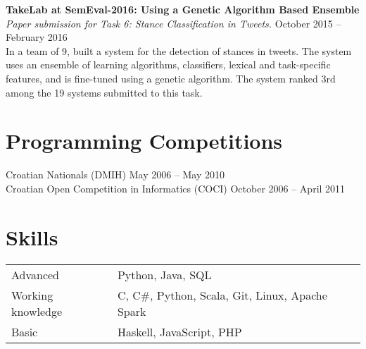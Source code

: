 \documentclass[margin,line]{resume}
\begin{document}
\begin{resume}
\textbf{TakeLab at SemEval-2016: Using a Genetic Algorithm Based Ensemble} \vspace{1mm}\\\vspace{1mm}%
\textsl{Paper submission for Task 6: Stance Classification in Tweets.} \hfill October 2015 -- February 2016\\%
In a team of 9, built a system for the detection of stances in tweets. The system uses an ensemble of learning algorithms, classifiers, lexical and task-specific features, and is fine-tuned using a genetic algorithm. The system ranked 3rd among the 19 systems submitted to this task.

\vspace{1mm}
\section{\mysidestyle Programming Competitions} 

Croatian Nationals (DMIH) \hfill May 2006 -- May 2010\\%
Croatian Open Competition in Informatics (COCI) \hfill October 2006 -- April 2011%

\vspace{1mm}
\section{\mysidestyle Skills}

\begin{tabular}{@{}ll@{}}
Advanced & Python, Java, SQL \\%
Working knowledge & C, C\#, Python, Scala, Git, Linux, Apache Spark \\%
Basic & Haskell, JavaScript, PHP \\%
\end{tabular}




\end{resume}
\end{document}
